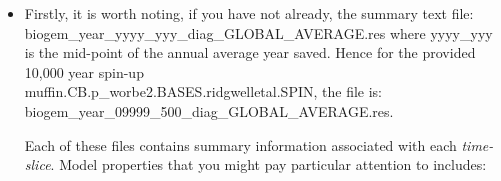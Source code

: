 \begin{itemize}[noitemsep]

\vspace{2mm}
\item Firstly, it is worth noting, if you have not already, the summary text file: 
\\\textsf{\footnotesize biogem\_year\_yyyy\_yyy\_diag\_GLOBAL\_AVERAGE.res}
where \textsf{\footnotesize yyyy\_yyy} is the mid-point of the annual average year saved. Hence for the provided 10,000 year spin-up \\\textsf{\footnotesize muffin.CB.p\_worbe2.BASES.ridgwelletal.SPIN}, the file is: \\\textsf{\footnotesize biogem\_year\_09999\_500\_diag\_GLOBAL\_AVERAGE.res}. 

\vspace{1mm}
Each of these files contains summary information associated with each \textit{time-slice}. Model properties that you might pay particular attention to includes:


\end{itemize}
